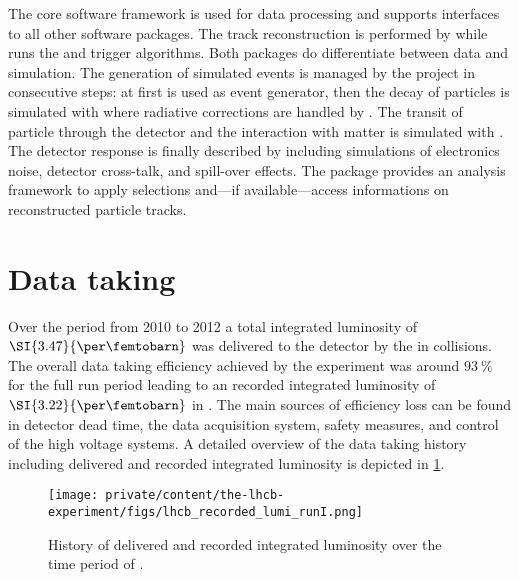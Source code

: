 The \LHCb core software framework \Gaudi \cite{set:soft:gaudi} is used for data
processing and supports interfaces to all other software packages. The track
reconstruction is performed by \Brunel \cite{soft:brunel} while \Moore
\cite{soft:moore} runs the \HLTOne and \HLTTwo trigger algorithms. Both packages
do differentiate between data and simulation. The generation of simulated events
is managed by the \Gauss \cite{set:soft:gauss} project in consecutive steps: at
first \Pythia \cite{set:soft:pythia} is used as event generator, then the decay
of particles is simulated with \EvtGen \cite{Lange:2001uf} where radiative
corrections are handled by \Photos \cite{set:soft:photos}. The transit of
particle through the detector and the interaction with matter is simulated with
\GeantFour \cite{set:soft:geantfour}. The detector response is finally described
by \Boole \cite{soft:boole} including simulations of electronics noise, detector
cross-talk, and spill-over effects. The \DaVinci \cite{soft:davinci} package
provides an analysis framework to apply selections and---if available---access
\MC informations on reconstructed particle tracks.

\section{Data taking}
\label{sec:lhcb_experiment:data}

Over the \RunOne period from 2010 to 2012 a total integrated luminosity of
$\SI{3.47}{\per\femtobarn}$ was delivered to the \LHCb detector by the \LHC in
\protonproton collisions. The overall data taking efficiency achieved by the
experiment was around $\SI{93}{\percent}$ for the full run period leading to an
recorded integrated luminosity of $\SI{3.22}{\per\femtobarn}$ in \RunOne. The
main sources of efficiency loss can be found in detector dead time, the data
acquisition system, \VELO safety measures, and control of the high voltage
systems. A detailed overview of the data taking history including delivered and
recorded integrated luminosity is depicted in
\cref{fig:lhcb_experiment:data:integrated_lumi}.
%
\begin{figure}[t]
  \centering
  \texttt{[image: private/content/the-lhcb-experiment/figs/lhcb\_recorded\_lumi\_runI.png]}
  \caption{
    History of delivered and recorded integrated luminosity over the time period of \RunOne.
  }
  \label{fig:lhcb_experiment:data:integrated_lumi}
\end{figure}



